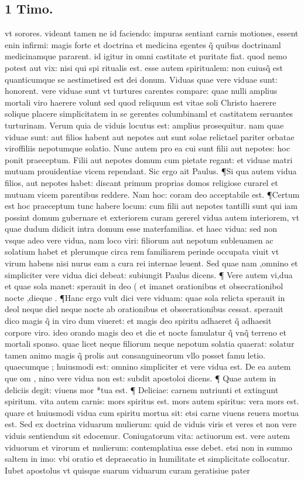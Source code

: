 \documentclass{article}
\begin{document}
\begin{pages}
\section*{1 Timo. }
\marginpar{[ p.209 ]}\pstart vt sorores. videant tamen ne id faciendo: impuras sentiant carnis motiones, essent enin infirmi: magis forte et doctrina et medicina egentes q̃ quibus doctrinaml medicinamque pararent. id igitur in omni castitate et puritate fiat. quod nemo potest aut vix: nisi qui spi ritualis est. esse autem spiritualem: non cuiusq̃ est quanticumque se aestimetised est dei donum. Viduas quae vere viduae sunt: honorent. vere viduae sunt vt turtures carentes compare: quae nulli amplius mortali viro haerere volunt sed quod reliquum est vitae soli Christo haerere solique  placere simplicitatem in se gerentes columbinaml et castitatem seruantes turturinam. Verum quia de viduis locutus est: amplius prosequitur. nam quae viduae sunt: aut filios habent aut nepotes aut sunt solae relictael pariter orbatae viroffiliis nepotumque solatio. Nunc autem pro ea cui sunt filii aut nepotes: hoc ponit praeceptum. Filii aut nepotes domum cum pietate regant: et viduae matri mutuam prouidentiae vicem rependant. Sic ergo ait Paulus. ¶Si qua autem vidua filios, aut nepotes habet: discant primum proprias domos religiose curarel et mutuam vicem parentibus reddere. Nam hoc: coram deo acceptabile est. ¶Certum est hoc praeceptum tunc habere locum: cum filii aut nepotes tantilli sunt qui iam possint domum gubernare et exteriorem curam gererel vidua autem interiorem, vt quae dudum didicit intra domum esse materfamilias. et haec vidua: sed non vsque adeo vere vidua, nam loco viri: filiorum aut nepotum subleuamen ac solatium habet et plerumque circa rem familiarem perinde occupata viuit vt virum habens nisi nurus eam a cura rei internae leuent. Sed quae nam ,omnino et simpliciter vere vidua dici debeat: subiungit Paulus dicens. ¶ Vere autem vi,dua et quae sola manet: sperauit in deo ( et imanet orationibus et obsecrationibol nocte ,dieque . ¶Hanc ergo vult dici vere viduam: quae sola relicta sperauit in deol neque diel neque  nocte ab orationibus et obsecrationibus cessat. sperauit dico magis q̃ in viro dum viueret: et magis deo spiritu adhaeret q̃ adhaesit corpore viro. ideo orando magis deo et die et nocte famulatur q̃ vnq̃ terreno et mortali sponso. quae licet neque filiorum neque nepotum solatia quaerat: solatur tamen animo magis q̃ prolis aut consanguineorum vllo posset famu letio. quaecumque ; huiusmodi est: omnino simpliciter et vere vidua est. De ea autem que om , nino vere vidua non est: subdit apostoloi dicens. ¶ Quae autem in deliciis degit: viuens mor *tua est. ¶ Deliciae: carnem nutriunti et extingunt spiritum. vita autem carnis: mors spiritus est. mors autem spiritus: vera mors est. quare et huiusmodi vidua cum spiritu mortua sit: etsi carne viuens reuera mortua est. Sed ex doctrina viduarum mulierum: quid de viduis viris et veres et non vere viduis sentiendum sit edocemur. Coniugatorum vita: actiuorum est. vere autem viduorum et virorum et mulierum: contemplatiua esse debet. etsi non in summo saltem in imo: vbi oratio et depraecatio in humilitate et simplicitate collocatur. Iubet apostolus vt quisque suarum viduarum curam geratisiue pater 
\end{pages}
\end{document}
